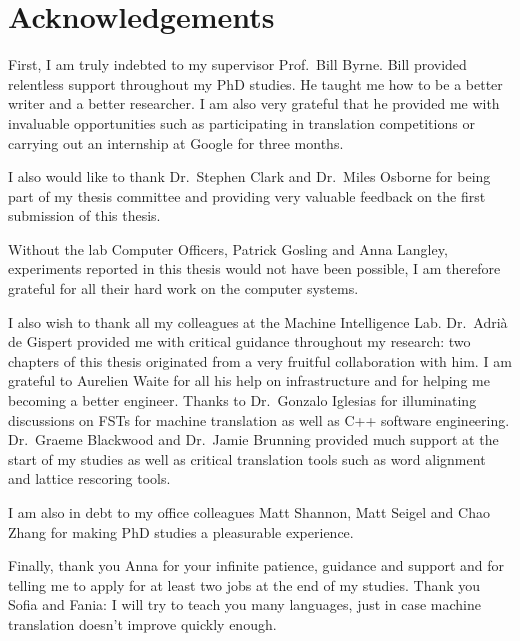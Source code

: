 \chapter*{Acknowledgements}

First, I am truly indebted to my supervisor
Prof.\ Bill Byrne.
Bill provided relentless support throughout
my PhD studies.
He taught me how to be a better writer and a better researcher.
I am also very grateful that he provided me with
invaluable opportunities such as participating
in translation competitions or carrying out an internship
at Google for three months.

I also would like to thank Dr.\ Stephen Clark and Dr.\ Miles
Osborne for being part of my thesis committee and providing
very valuable feedback on the first submission of this thesis.

Without the lab Computer Officers, Patrick Gosling
and Anna Langley, experiments reported in this thesis
would not have been possible, I am therefore
grateful for all their hard work on the computer
systems.

I also wish to thank all my colleagues at
the Machine Intelligence Lab.
Dr.\ Adrià de Gispert provided me with
critical guidance throughout my research: two chapters
of this thesis originated from a very fruitful collaboration
with him.
I am grateful to Aurelien Waite for all his
help on infrastructure and for helping me becoming
a better engineer.
Thanks to Dr.\ Gonzalo Iglesias for illuminating
discussions on FSTs for machine translation as well
as C++ software engineering.
Dr.\ Graeme Blackwood and Dr.\ Jamie Brunning
provided much support at the start of my studies as
well as critical translation tools such as word alignment
and lattice rescoring tools.

I am also in debt to my office colleagues Matt Shannon, Matt Seigel
and Chao Zhang for making PhD studies a pleasurable experience.

Finally, thank you Anna for your infinite patience, guidance and
support and for telling me to apply for at least two jobs at
the end of my studies. Thank you Sofia and Fania: I will
try to teach you many languages, just in case machine translation
doesn't improve quickly enough.
